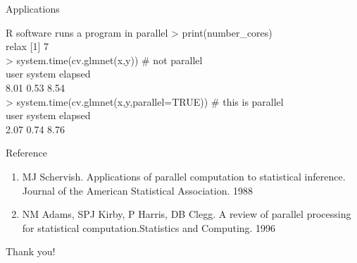\documentclass[10pt,aspectratio=169]{beamer}
\begin{document}
\begin{sloppypar}
\begin{frame}{Applications}
	\begin{block}{R software runs a program in parallel}
		> print(number\_cores)  \\relax
		[1] 7   \\
		> system.time(cv.glmnet(x,y))                \# not parallel  \\
		user system elapsed   \\
		8.01 0.53 8.54   \\		
		> system.time(cv.glmnet(x,y,parallel=TRUE))  \# this is parallel  \\
		user system elapsed   \\
		2.07 0.74 8.76  
	\end{block}
\end{frame}

\begin{frame}{Reference}
\begin{enumerate}
	\item MJ Schervish. Applications of parallel computation to statistical inference. Journal of the American Statistical Association. 1988 
		\item NM Adams, SPJ Kirby, P Harris, DB Clegg. A review of parallel processing for statistical computation.Statistics and Computing. 1996 
	\end{enumerate}
\end{frame}

\begin{frame}
\begin{center}
\Huge{Thank you!}
\end{center}
\end{frame}



\end{sloppypar}
\end{document}

